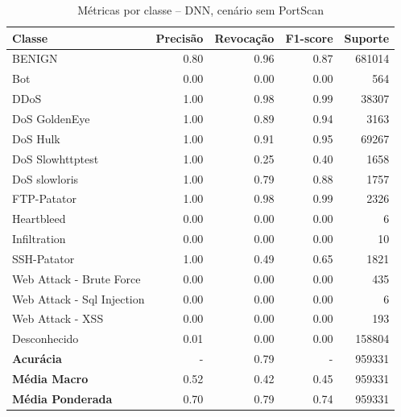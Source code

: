 \begin{table}[H]
    \centering
    \small
    \begin{tabular}{lrrrr}
        \hline
        Classe                     & Precisão & Revocação & F1-score & Suporte \\
        \hline
        BENIGN                     & 0.80     & 0.96      & 0.87     & 681014  \\
        Bot                        & 0.00     & 0.00      & 0.00     & 564     \\
        DDoS                       & 1.00     & 0.98      & 0.99     & 38307   \\
        DoS GoldenEye              & 1.00     & 0.89      & 0.94     & 3163    \\
        DoS Hulk                   & 1.00     & 0.91      & 0.95     & 69267   \\
        DoS Slowhttptest           & 1.00     & 0.25      & 0.40     & 1658    \\
        DoS slowloris              & 1.00     & 0.79      & 0.88     & 1757    \\
        FTP-Patator                & 1.00     & 0.98      & 0.99     & 2326    \\
        Heartbleed                 & 0.00     & 0.00      & 0.00     & 6       \\
        Infiltration               & 0.00     & 0.00      & 0.00     & 10      \\
        SSH-Patator                & 1.00     & 0.49      & 0.65     & 1821    \\
        Web Attack - Brute Force   & 0.00     & 0.00      & 0.00     & 435     \\
        Web Attack - Sql Injection & 0.00     & 0.00      & 0.00     & 6       \\
        Web Attack - XSS           & 0.00     & 0.00      & 0.00     & 193     \\
        Desconhecido               & 0.01     & 0.00      & 0.00     & 158804  \\
        \hline
        \textbf{Acurácia}          & -        & 0.79      & -        & 959331  \\
        \textbf{Média Macro}       & 0.52     & 0.42      & 0.45     & 959331  \\
        \textbf{Média Ponderada}   & 0.70     & 0.79      & 0.74     & 959331  \\
        \hline
    \end{tabular}
    \caption{Métricas por classe -- DNN, cenário sem PortScan}
    \label{table:dnn_Sem_PortScan_metricas}
\end{table}